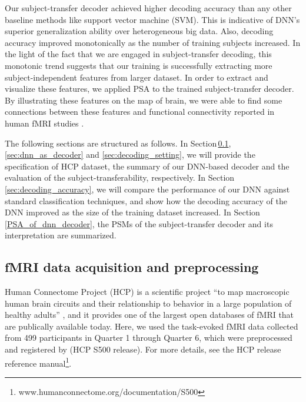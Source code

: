Our subject-transfer decoder achieved higher decoding accuracy than any
other baseline methods like support vector machine (SVM).
%
This is indicative of DNN's superior generalization ability over heterogeneous big data.
%
Also, decoding accuracy improved monotonically as the number of training subjects increased.
%
In the light of the fact that we are engaged in subject-transfer
decoding, this monotonic trend suggests that our training is
successfully extracting more subject-independent features from larger
dataset.
%
In order to extract and visualize these features, we applied PSA to the
trained subject-transfer decoder.
%
By illustrating these features on the map of brain, we were able to find
some connections between these features and functional connectivity
reported in human fMRI studies \cite{raichle2001default,raichle2007default,taylor2009two,cole2013multi}.

The following sections are structured as follows.
%
In Section\,\ref{sec:fmri_data_specification},
\ref{sec:dnn_as_decoder} and \ref{sec:decoding_setting}, we will provide
the specification of HCP dataset, the summary of our DNN-based decoder
and the evaluation of the subject-transferability, respectively.
%
In Section\,\ref{sec:decoding_accuracy}, we will compare the
performance of our DNN against standard classification techniques, and
show how the decoding accuracy of the DNN improved as the size of the
training dataset increased.
%
In Section\,\ref{PSA_of_dnn_decoder}, the PSMs of the subject-transfer
decoder and its interpretation are summarized.


\subsection{fMRI data acquisition and preprocessing}
\label{sec:fmri_data_specification}
Human Connectome Project (HCP) is a scientific project ``to map macroscopic human brain circuits and their relationship to behavior in a large population of healthy adults'' \cite{van2013wu}, and it provides one of the largest open databases of fMRI that are publically available today.
%
Here, we used the task-evoked fMRI data collected from 499 participants in Quarter 1 through Quarter 6,
which were  preprocessed and registered by \cite{van2013wu,glasser2013minimal} (HCP S500 release).
%
For more details, see the HCP release reference manual\footnote{www.humanconnectome.org/documentation/S500}.

